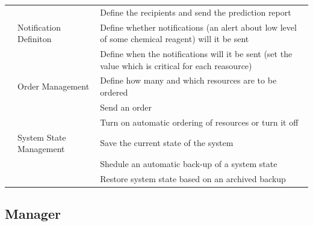 \documentclass[a4paper,11pt,twoside]{report}
\theoremstyle{definition}
\begin{document}
\begin{longtable}{|p{3cm}|p{3cm}|p{10cm}|}
\texttt{} &  & Define the recipients and send the prediction report \\ \cline{2-3}
\texttt{} & Notification Definiton & Define whether notifications (an alert about low level of some chemical reagent) will it be sent\\ \cline{3-3}
\texttt{} &  & Define when the notifications will it be sent (set the value which is critical for each reasource)\\ \cline{2-3}
\texttt{} & Order Management & Define how many and which resources are to be ordered\\ \cline{3-3}


\texttt{} & & Send an order\\ \cline{3-3}


\texttt{} & & Turn on automatic ordering of resources or turn it off\\ \cline{2-3}
\texttt{} & System State Management & Save the current state of the system\\ \cline{3-3}
\texttt{} & & Shedule an automatic back-up of a system state\\ \cline{3-3}
\texttt{} & & Restore system state based on an archived backup\\ \hline


\end{longtable}

\subsection{Manager}
\end{document}
